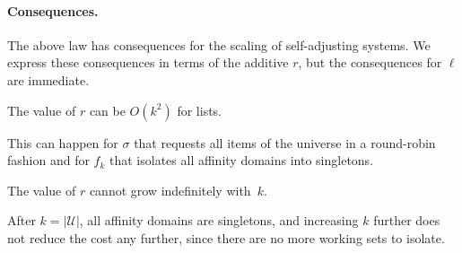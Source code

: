 \paragraph*{Consequences.}
The above law has consequences for the scaling of self-adjusting systems. We express these consequences in terms of the additive $r$, but the consequences for $\ell$ are immediate.



\begin{observation}
	\label{obs:list-k2}
	The value of $r$ can be $O(k^2)$ for lists.
\end{observation}
This can happen for $\sigma$ that requests all items of the universe in a round-robin fashion and for $f_k$ that isolates all affinity domains into singletons. 


\begin{observation}
	\label{obs:initial}
	The value of $r$ cannot grow indefinitely with~$k$.
\end{observation}
After $k = |\mathcal{U}|$, all affinity domains are singletons, and increasing $k$ further does not reduce the cost any further, since there are no more working sets to isolate.

